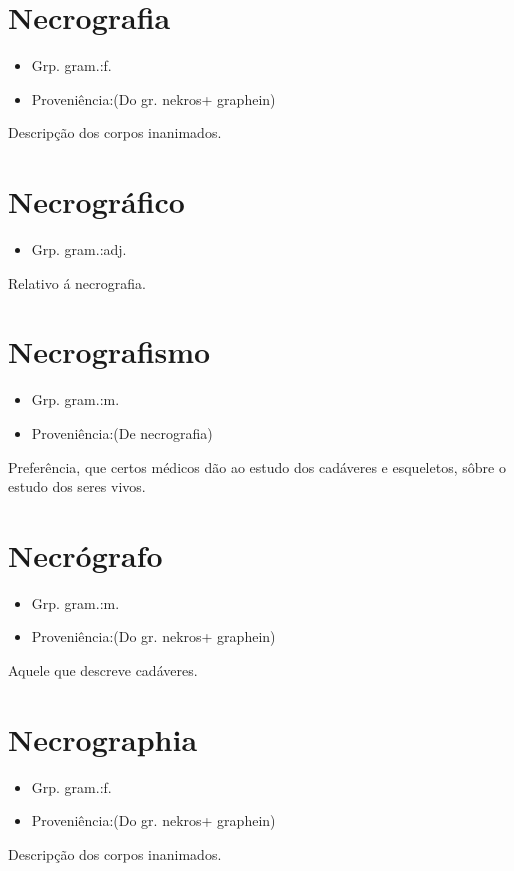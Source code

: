 \section{Necrografia}
\begin{itemize}
\item {Grp. gram.:f.}
\end{itemize}
\begin{itemize}
\item {Proveniência:(Do gr. \textunderscore nekros\textunderscore  + \textunderscore graphein\textunderscore )}
\end{itemize}
Descripção dos corpos inanimados.
\section{Necrográfico}
\begin{itemize}
\item {Grp. gram.:adj.}
\end{itemize}
Relativo á necrografia.
\section{Necrografismo}
\begin{itemize}
\item {Grp. gram.:m.}
\end{itemize}
\begin{itemize}
\item {Proveniência:(De \textunderscore necrografia\textunderscore )}
\end{itemize}
Preferência, que certos médicos dão ao estudo dos cadáveres e esqueletos, sôbre o estudo dos seres vivos.
\section{Necrógrafo}
\begin{itemize}
\item {Grp. gram.:m.}
\end{itemize}
\begin{itemize}
\item {Proveniência:(Do gr. \textunderscore nekros\textunderscore  + \textunderscore graphein\textunderscore )}
\end{itemize}
Aquele que descreve cadáveres.
\section{Necrographia}
\begin{itemize}
\item {Grp. gram.:f.}
\end{itemize}
\begin{itemize}
\item {Proveniência:(Do gr. \textunderscore nekros\textunderscore  + \textunderscore graphein\textunderscore )}
\end{itemize}
Descripção dos corpos inanimados.
